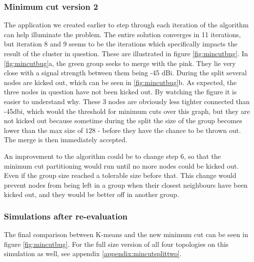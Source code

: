 \subsubsection{Minimum cut version 2}
The application we created earlier to step through each iteration of the algorithm can help illuminate the problem. The entire solution converges in 11 iterations, but iteration 8 and 9 seems to be the iterations which specifically impacts the result of the cluster in question.
These are illustrated in figure \ref{fig:mincutbug}. In \ref{fig:mincutbug}a, the green group seeks to merge with the pink. They lie very close with a signal strength between them being -45 dBi.
During the split several nodes are kicked out, which can be seen in \ref{fig:mincutbug}b. As expected, the three nodes in question have not been kicked out. By watching the figure it is easier to understand why.
These 3 nodes are obviously less tighter connected than -45dbi, which would the threshold for minimum cuts over this graph, but they are not kicked out because sometime during the split the size of the group becomes lower than the max size of $128$ - before they have the chance to be thrown out. The merge is then immediately accepted. 

An improvement to the algorithm could be to change step 6, so that the minimum cut partitioning would run until no more nodes could be kicked out. Even if the group size reached a tolerable size before that. This change would prevent nodes from being left in a group when their closest neighbours have been kicked out, and they would be better off in another group.

\subsubsection{Simulations after re-evaluation}
The final comparison between K-means and the new minimum cut can be seen in figure \ref{fig:mincutbug}. For the full size version of
all four topologies on this simulation as well, see appendix \ref{appendix:mincutsplittwo}. 

